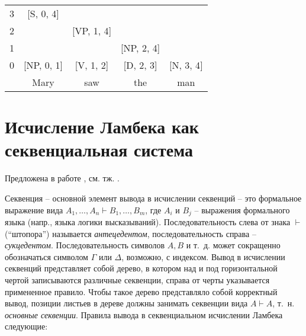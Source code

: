 \begin{tabular}[t]{ccccc}
\cline{2-2}
\multicolumn{1}{c|}{3} & \multicolumn{1}{c|}{{[}S, 0, 4{]}}  &                                     &                                     &                                    \\ \cline{2-3}
\multicolumn{1}{c|}{2} & \multicolumn{1}{c|}{}               & \multicolumn{1}{c|}{{[}VP, 1, 4{]}} &                                     &                                    \\ \cline{2-4}
\multicolumn{1}{c|}{1} & \multicolumn{1}{c|}{}               & \multicolumn{1}{c|}{}               & \multicolumn{1}{c|}{{[}NP, 2, 4{]}} &                                    \\ \cline{2-5} 
\multicolumn{1}{c|}{0} & \multicolumn{1}{c|}{{[}NP, 0, 1{]}} & \multicolumn{1}{c|}{{[}V, 1, 2{]}}  & \multicolumn{1}{c|}{{[}D, 2, 3{]}}  & \multicolumn{1}{c|}{{[}N, 3, 4{]}} \\ \cline{2-5} 
                       & Mary                                & saw                                 & the                                 & man                               
\end{tabular}


\section{Исчисление Ламбека как секвенциальная система}

Предложена в работе \parencite{lambek1958mathematics}, см. тж. \parencite{moot2012logic}.

Секвенция -- основной элемент вывода в исчислении секвенций -- это формальное выражение вида $A_1, \dots, A_n \vdash B_1, \dots, B_m$, где $A_i$ и $B_j$ -- выражения формального языка (напр., языка логики высказываний). Последовательность слева от знака $\vdash$ (``штопора'') называется \textit{антецедентом}, последовательность справа -- \textit{сукцедентом}. Последовательность символов $A, B$ и т.~д. может сокращенно обозначаться символом $\Gamma$ или $\Delta$, возможно, с индексом. Вывод в исчислении секвенций представляет собой дерево, в котором над и под горизонтальной чертой записываются различные секвенции, справа от черты указывается примененное правило. Чтобы такое дерево представляло собой корректный вывод, позиции листьев в дереве должны занимать секвенции вида $A \vdash A$, т.~н. \textit{основные секвенции}. Правила вывода в секвенциальном исчислении Ламбека следующие:

\begin{prooftree}
\end{prooftree}

